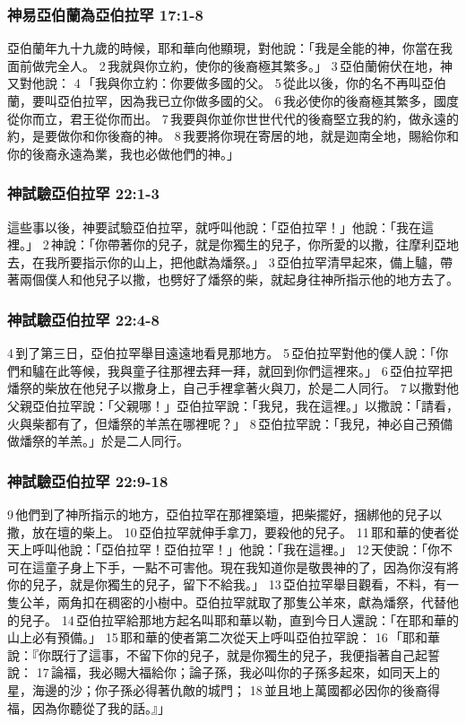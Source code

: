 \subsubsection{神易亞伯蘭為亞伯拉罕 17:1-8}
亞伯蘭年九十九歲的時候，耶和華向他顯現，對他說：「我是全能的神，你當在我面前做完全人。 2 我就與你立約，使你的後裔極其繁多。」 3 亞伯蘭俯伏在地，神又對他說： 4 「我與你立約：你要做多國的父。 5 從此以後，你的名不再叫亞伯蘭，要叫亞伯拉罕，因為我已立你做多國的父。 6 我必使你的後裔極其繁多，國度從你而立，君王從你而出。 7 我要與你並你世世代代的後裔堅立我的約，做永遠的約，是要做你和你後裔的神。 8 我要將你現在寄居的地，就是迦南全地，賜給你和你的後裔永遠為業，我也必做他們的神。」



\subsubsection{神試驗亞伯拉罕 22:1-3}
這些事以後，神要試驗亞伯拉罕，就呼叫他說：「亞伯拉罕！」他說：「我在這裡。」 2 神說：「你帶著你的兒子，就是你獨生的兒子，你所愛的以撒，往摩利亞地去，在我所要指示你的山上，把他獻為燔祭。」 3 亞伯拉罕清早起來，備上驢，帶著兩個僕人和他兒子以撒，也劈好了燔祭的柴，就起身往神所指示他的地方去了。 

\subsubsection{神試驗亞伯拉罕 22:4-8}
4 到了第三日，亞伯拉罕舉目遠遠地看見那地方。 5 亞伯拉罕對他的僕人說：「你們和驢在此等候，我與童子往那裡去拜一拜，就回到你們這裡來。」 6 亞伯拉罕把燔祭的柴放在他兒子以撒身上，自己手裡拿著火與刀，於是二人同行。 7 以撒對他父親亞伯拉罕說：「父親哪！」亞伯拉罕說：「我兒，我在這裡。」以撒說：「請看，火與柴都有了，但燔祭的羊羔在哪裡呢？」 8 亞伯拉罕說：「我兒，神必自己預備做燔祭的羊羔。」於是二人同行。


\subsubsection{神試驗亞伯拉罕 22:9-18}
9 他們到了神所指示的地方，亞伯拉罕在那裡築壇，把柴擺好，捆綁他的兒子以撒，放在壇的柴上。 10 亞伯拉罕就伸手拿刀，要殺他的兒子。 11 耶和華的使者從天上呼叫他說：「亞伯拉罕！亞伯拉罕！」他說：「我在這裡。」 12 天使說：「你不可在這童子身上下手，一點不可害他。現在我知道你是敬畏神的了，因為你沒有將你的兒子，就是你獨生的兒子，留下不給我。」 13 亞伯拉罕舉目觀看，不料，有一隻公羊，兩角扣在稠密的小樹中。亞伯拉罕就取了那隻公羊來，獻為燔祭，代替他的兒子。 14 亞伯拉罕給那地方起名叫耶和華以勒，直到今日人還說：「在耶和華的山上必有預備。」 15 耶和華的使者第二次從天上呼叫亞伯拉罕說： 16 「耶和華說：『你既行了這事，不留下你的兒子，就是你獨生的兒子，我便指著自己起誓說： 17 論福，我必賜大福給你；論子孫，我必叫你的子孫多起來，如同天上的星，海邊的沙；你子孫必得著仇敵的城門； 18 並且地上萬國都必因你的後裔得福，因為你聽從了我的話。』」

